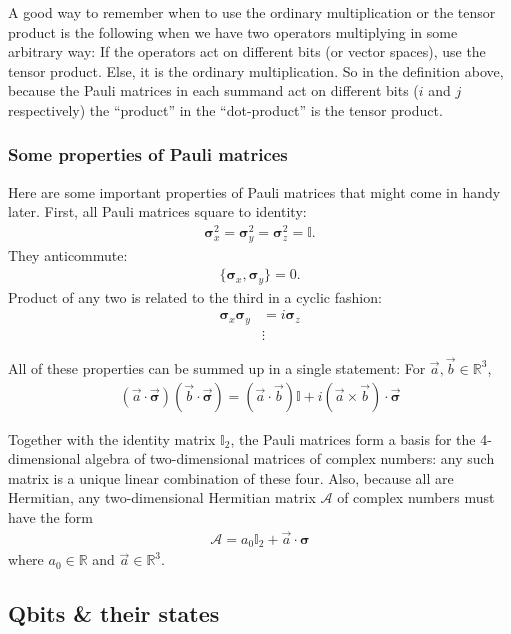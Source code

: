 \documentclass{book}
\theoremstyle{definition}
\newcommand{\R}{\mathbb{R}}
\newcommand{\nn}{\nonumber}
\newcommand{\sig}{\bm\sigma}
\newcommand{\Id}{\mathbb{I}}
\begin{document}
A good way to remember when to use the ordinary multiplication or the tensor product is the following when we have two operators multiplying in some arbitrary way: If the operators act on different bits (or vector spaces), use the tensor product. Else, it is the ordinary multiplication. So in the definition above, because the Pauli matrices in each summand act on different bits ($i$ and $j$ respectively) the ``product'' in the ``dot-product'' is the tensor product. 

\subsubsection{Some properties of Pauli matrices}
Here are some important properties of Pauli matrices that might come in handy later. First, all Pauli matrices square to identity:
\begin{align}
\sig_x^2 = \sig_y^2 = \sig_z^2 = \Id.
\end{align}
They anticommute:
\begin{align}
\{ \sig_x, \sig_y \} = 0.
\end{align}
Product of any two is related to the third in a cyclic fashion:
\begin{align}
\sig_x \sig_y &= i\sig_z\\
&\vdots\nn
\end{align}

All of these properties can be summed up in a single statement: For $\vec{a}, \vec{b} \in \R^3$, 
\begin{align}
\boxed{(\vec{a}\cdot \vec{\sig})(\vec{b}\cdot\vec{\sig}) = (\vec{a}\cdot \vec{b})\Id + i(\vec{a}\times \vec{b})\cdot \vec{\sig}}
\end{align}

Together with the identity matrix $\Id_2$, the Pauli matrices form a basis for the 4-dimensional algebra of two-dimensional matrices of complex numbers: any such matrix is a unique linear combination of these four. Also, because all are Hermitian, any two-dimensional Hermitian matrix $\mathcal{A}$ of complex numbers must have the form
\begin{align}
\mathcal{A} = a_0 \Id_2 + \vec{a}\cdot \sig
\end{align}
where $a_0 \in \R$ and $\vec{a} \in \R^3$. 











\subsection{Qbits \& their states}
\end{document}

